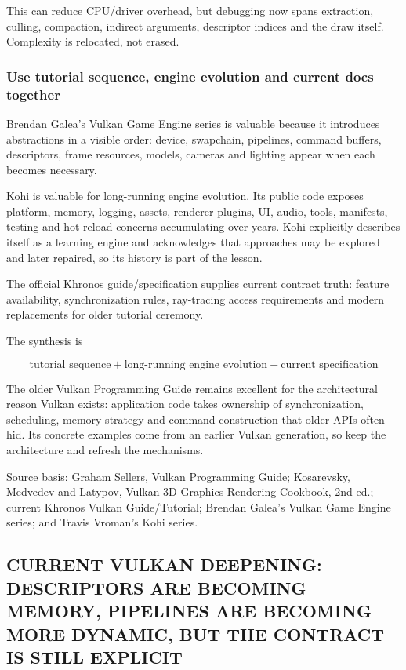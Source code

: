This can reduce CPU/driver overhead, but debugging now spans extraction, culling, compaction, indirect arguments, descriptor indices and the draw itself. Complexity is relocated, not erased.

\subsubsection{Use tutorial sequence, engine evolution and current docs together}\label{05-engine-i-ch023-use-tutorial-sequence-engine-evolution-and-current-docs-together}

Brendan Galea's Vulkan Game Engine series is valuable because it introduces abstractions in a visible order: device, swapchain, pipelines, command buffers, descriptors, frame resources, models, cameras and lighting appear when each becomes necessary.

Kohi is valuable for long-running engine evolution. Its public code exposes platform, memory, logging, assets, renderer plugins, UI, audio, tools, manifests, testing and hot-reload concerns accumulating over years. Kohi explicitly describes itself as a learning engine and acknowledges that approaches may be explored and later repaired, so its history is part of the lesson.

The official Khronos guide/specification supplies current contract truth: feature availability, synchronization rules, ray-tracing access requirements and modern replacements for older tutorial ceremony.

The synthesis is

\[
\boxed{
\text{tutorial sequence}
+
\text{long-running engine evolution}
+
\text{current specification}
}
\]

The older Vulkan Programming Guide remains excellent for the architectural reason Vulkan exists: application code takes ownership of synchronization, scheduling, memory strategy and command construction that older APIs often hid. Its concrete examples come from an earlier Vulkan generation, so keep the architecture and refresh the mechanisms.

Source basis: Graham Sellers, Vulkan Programming Guide; Kosarevsky, Medvedev and Latypov, Vulkan 3D Graphics Rendering Cookbook, 2nd ed.; current Khronos Vulkan Guide/Tutorial; Brendan Galea's Vulkan Game Engine series; and Travis Vroman's Kohi series.

\subsection{CURRENT VULKAN DEEPENING: DESCRIPTORS ARE BECOMING MEMORY, PIPELINES ARE BECOMING MORE DYNAMIC, BUT THE CONTRACT IS STILL EXPLICIT}\label{05-engine-i-ch023-current-vulkan-deepening-descriptors-are-becoming-memory-pipelines-are-becoming-more-dynamic-but-the-contract-is-still-explicit}

